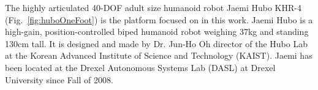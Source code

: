The highly articulated 40-DOF adult size humanoid robot Jaemi Hubo KHR-4 (Fig.~\ref{fig:huboOneFoot}) is the platform focused on in this work.  Jaemi Hubo is a high-gain, position-controlled biped humanoid robot weighing 37kg and standing 130cm tall.  It is designed and made by Dr. Jun-Ho Oh director of the Hubo Lab at the Korean Advanced Institute of Science and Technology (KAIST).  Jaemi has been located at the Drexel Autonomous Systems Lab (DASL) at Drexel University since Fall of 2008.


